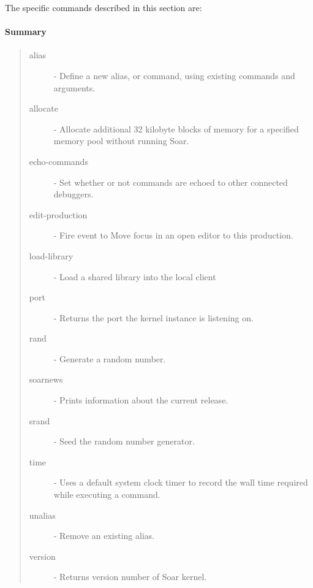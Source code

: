 
The specific commands described in this section are:


\paragraph{Summary}
\begin{quote}
\begin{description}
\item[alias] - Define a new alias, or command, using existing commands and arguments.
\item[allocate] - Allocate additional 32 kilobyte blocks of memory for a specified memory pool without running Soar.
\item[echo-commands] - Set whether or not commands are echoed to other connected debuggers. 
\item[edit-production] - Fire event to Move focus in an open editor to this production.
\item[load-library] - Load a shared library into the local client
\item[port] - Returns the port the kernel instance is listening on.
\item[rand] - Generate a random number.
\item[soarnews] - Prints information about the current release.
\item[srand] -  Seed the random number generator.
\item[time] - Uses a default system clock timer to record the wall time required while executing a command.
\item[unalias] - Remove an existing alias.
\item[version] - Returns version number of Soar kernel.
\end{description}
\end{quote}













